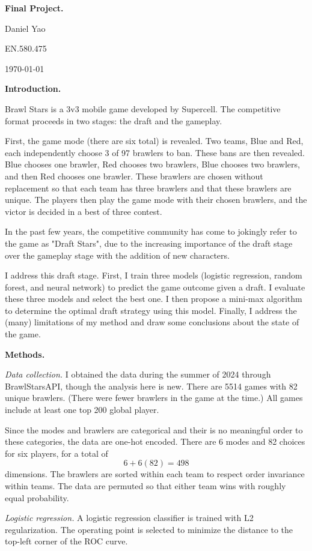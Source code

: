 \documentclass[12pt]{article}
\begin{document}
\textbf{Final Project.}

Daniel Yao

EN.580.475

\today

\textbf{Introduction.}

Brawl Stars is a 3v3 mobile game developed by Supercell. The competitive format proceeds in two stages: the draft and the gameplay.

First, the game mode (there are six total) is revealed. Two teams, Blue and Red, each independently choose 3 of 97 brawlers to ban. These bans are then revealed. Blue chooses one brawler, Red chooses two brawlers, Blue chooses two brawlers, and then Red chooses one brawler. These brawlers are chosen without replacement so that each team has three brawlers and that these brawlers are unique. The players then play the game mode with their chosen brawlers, and the victor is decided in a best of three contest.

In the past few years, the competitive community has come to jokingly refer to the game as "Draft Stars", due to the increasing importance of the draft stage over the gameplay stage with the addition of new characters.

I address this draft stage. First, I train three models (logistic regression, random forest, and neural network) to predict the game outcome given a draft. I evaluate these three models and select the best one. I then propose a mini-max algorithm to determine the optimal draft strategy using this model. Finally, I address the (many) limitations of my method and draw some conclusions about the state of the game.

\textbf{Methods.}

\textit{Data collection.} I obtained the data during the summer of 2024 through BrawlStarsAPI, though the analysis here is new. There are 5514 games with 82 unique brawlers. (There were fewer brawlers in the game at the time.) All games include at least one top 200 global player.

Since the modes and brawlers are categorical and their is no meaningful order to these categories, the data are one-hot encoded. There are 6 modes and 82 choices for six players, for a total of 
$$6 + 6(82) = 498$$
dimensions. The brawlers are sorted within each team to respect order invariance within teams. The data are permuted so that either team wins with roughly equal probability.

\textit{Logistic regression.} A logistic regression classifier is trained with L2 regularization. The operating point is selected to minimize the distance to the top-left corner of the ROC curve.
\end{document}
